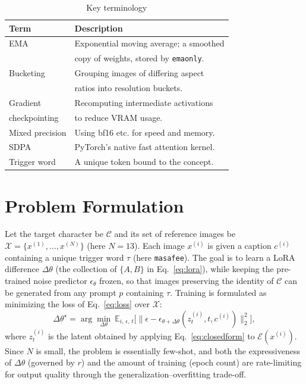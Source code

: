 \documentclass[10pt,twocolumn]{article}
\begin{document}
\begin{table}[t]\centering\small
\caption{Key terminology}
\label{tab:notation}
\begin{tabular}{ll}
\toprule
Term & Description \\
\midrule
EMA & Exponential moving average; a smoothed \\
    & copy of weights, stored by \texttt{emaonly}. \\
Bucketing & Grouping images of differing aspect \\
          & ratios into resolution buckets. \\
Gradient & Recomputing intermediate activations \\
checkpointing & to reduce VRAM usage. \\
Mixed precision & Using bf16 etc. for speed and memory. \\
SDPA & PyTorch's native fast attention kernel. \\
Trigger word & A unique token bound to the concept. \\
\bottomrule
\end{tabular}
\end{table}

\section{Problem Formulation}
Let the target character be $\mathcal{C}$ and its set of reference images be $\mathcal{X}=\{x^{(1)},\dots,x^{(N)}\}$ (here $N=13$). Each image $x^{(i)}$ is given a caption $c^{(i)}$ containing a unique trigger word $\tau$ (here \texttt{masafee}). The goal is to learn a LoRA difference $\Delta\theta$ (the collection of $\{A,B\}$ in Eq.~\eqref{eq:lora}), while keeping the pre-trained noise predictor $\epsilon_\theta$ frozen, so that images preserving the identity of $\mathcal{C}$ can be generated from any prompt $p$ containing $\tau$. Training is formulated as minimizing the loss of Eq.~\eqref{eq:loss} over $\mathcal{X}$:
\begin{equation}
\Delta\theta^{\star}=\arg\min_{\Delta\theta}\ \mathbb{E}_{i,\,\epsilon,\,t}\Big[\big\lVert\epsilon-\epsilon_{\theta+\Delta\theta}(z_t^{(i)},t,c^{(i)})\big\rVert_2^2\Big],
\end{equation}
where $z_t^{(i)}$ is the latent obtained by applying Eq.~\eqref{eq:closedform} to $\mathcal{E}(x^{(i)})$. Since $N$ is small, the problem is essentially few-shot, and both the expressiveness of $\Delta\theta$ (governed by $r$) and the amount of training (epoch count) are rate-limiting for output quality through the generalization--overfitting trade-off.
\end{document}
